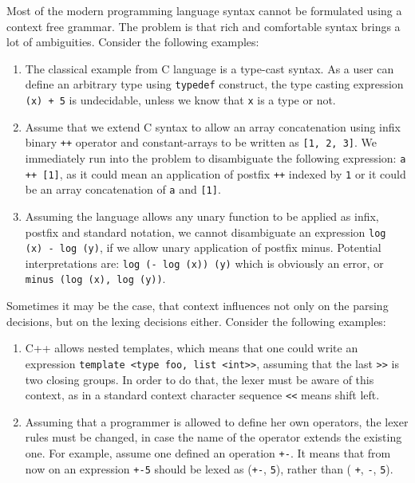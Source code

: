 

Most of the modern programming language syntax cannot be formulated
using a context free grammar.  The problem is that rich and comfortable
syntax brings a lot of ambiguities.  Consider the following examples:
\begin{enumerate}
    \item The classical example from C language is a type-cast 
          syntax.  As a user can define an arbitrary type using
          \verb|typedef| construct, the type casting expression
          \verb|(x) + 5| is undecidable, unless we know that 
          \verb|x| is a type or not.
    \item Assume that we extend C syntax to allow an array 
          concatenation using infix binary \verb|++| operator and
          constant-arrays to be written as \verb|[1, 2, 3]|.
          We immediately run into the problem to disambiguate the 
          following expression: \verb|a ++ [1]|, as it could mean
          an application of postfix \verb|++| indexed by \verb|1|
          or it could be an array concatenation of \verb|a| and 
          \verb|[1]|.
    \item Assuming the language allows any unary function to be
          applied as infix, postfix and standard notation, we cannot 
          disambiguate an expression \verb|log (x) - log (y)|, if
          we allow unary application of postfix minus.  Potential
          interpretations are: \verb|log (- log (x)) (y)| which is
          obviously an error, or \verb|minus (log (x), log (y))|.
\end{enumerate}

Sometimes it may be the case, that context influences not only on
the parsing decisions, but on the lexing decisions either.  Consider
the following examples:
\begin{enumerate}
    \item C++ allows nested templates, which means that one could
          write an expression \verb|template <type foo, list <int>>|, 
          assuming that the last \verb|>>| is two closing groups.  In
          order to do that, the lexer must be aware of this context,
          as in a standard context character sequence \verb|<<| means
          shift left.
    \item Assuming that a programmer is allowed to define her own 
          operators, the lexer rules must be changed, in case 
          the name of the operator extends the existing one.  For
          example, assume one defined an operation \verb|+-|.
          It means that from now on an expression \verb|+-5| should
          be lexed as (\verb|+-|, \verb|5|), rather than (
          \verb|+|, \verb|-|, \verb|5|).
\end{enumerate}

